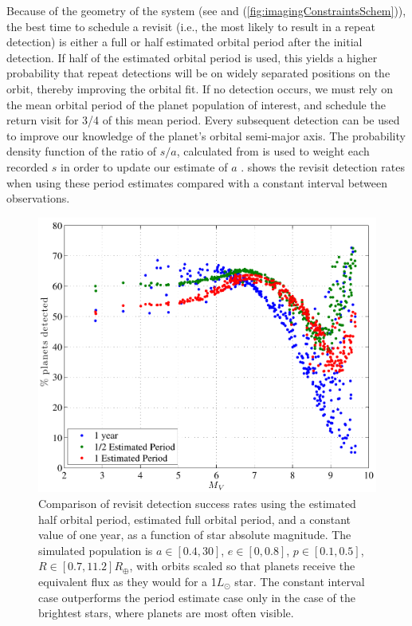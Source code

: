 Because of the geometry of the system (see  and (\ref{fig:imagingConstraintsSchem})), the best time to schedule a revisit (i.e., the most likely to result in a repeat detection) is either a full or half estimated orbital period after the initial detection.  If half of the estimated orbital period is used, this yields a higher probability that repeat detections will be on widely separated positions on the orbit, thereby improving the orbital fit.  If no detection occurs, we must rely on the mean orbital period of the planet population of interest, and schedule the return visit for 3/4 of this mean period.  Every subsequent detection can be used to improve our knowledge of the planet's orbital semi-major axis.  The probability density function of the ratio of $s/a$, calculated from  is used to  weight each recorded $s$ in order to update our estimate of $a$ \citep{savransky2007}.   shows the revisit detection rates when using these period estimates compared with a constant interval between observations.
\begin{figure}[ht]
\centering
   \includegraphics[width = 5.5in]{./figures/revisitStrategies}
 \caption[Revisit timing strategies]{ \label{fig:revisitStrategies} Comparison of revisit detection success rates using the estimated half orbital period, estimated full orbital period, and a constant value of one year, as a function of star absolute magnitude.  The simulated population is $a \in [0.4, 30]$, $e \in [0, 0.8]$, $p \in [0.1, 0.5]$, $R \in [0.7, 11.2]R_\oplus$, with orbits scaled so that planets receive the equivalent flux as they would for a 1$L_\odot$ star.  The constant interval case outperforms the period estimate case only in the case of the brightest stars, where planets are most often visible.}
 \end{figure}

